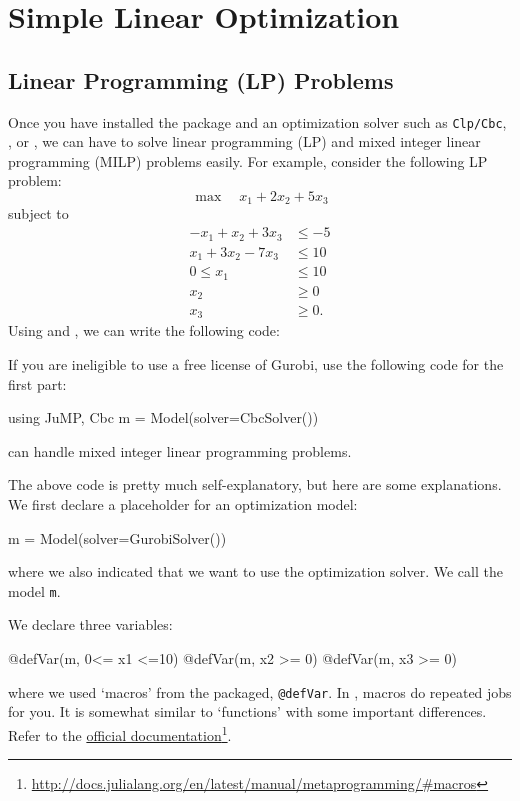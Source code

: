 \chapter{Simple Linear Optimization} \label{chap:simple}

\section{Linear Programming (LP) Problems}

Once you have installed the \jump{} package and an optimization solver such as \texttt{Clp/Cbc}, \gurobi{}, or \cplex{}, we can have \julia{} to solve linear programming (LP) and mixed integer linear programming (MILP) problems easily. For example, consider the following LP problem:
\[
	\max \quad x_1 + 2x_2 + 5x_3
\]
subject to
\begin{align*}
-x_1 + x_2 + 3x_3 &\leq -5 \\
x_1 + 3x_2 - 7x_3 &\leq 10 \\
0 \leq x_1 &\leq 10 \\
x_2 &\geq 0 \\
x_3 &\geq 0 .
\end{align*}
Using \julia{} and \jump{}, we can write the following code:
\begin{codelisting}
\end{codelisting}

If you are ineligible to use a free license of Gurobi, use the following code for the first part:
\begin{code}
using JuMP, Cbc
m = Model(solver=CbcSolver())
\end{code}
\noindent {} can handle mixed integer linear programming problems.


The above code is pretty much self-explanatory, but here are some explanations. We first declare a placeholder for an optimization model:
\begin{code}
m = Model(solver=GurobiSolver())
\end{code}
\noindent where we also indicated that we want to use the \gurobi{} optimization solver. We call the model \texttt{m}.

We declare three variables:
\begin{code}
@defVar(m, 0<= x1 <=10)
@defVar(m, x2 >= 0)
@defVar(m, x3 >= 0)
\end{code}
\noindent where we used `macros' from the \jump{} packaged, \texttt{@defVar}. In \julia{}, macros do repeated jobs for you. It is somewhat similar to `functions' with some important differences. Refer to the \href{http://docs.julialang.org/en/latest/manual/metaprogramming/#macros}{official documentation}\footnote{\url{http://docs.julialang.org/en/latest/manual/metaprogramming/#macros}}.

